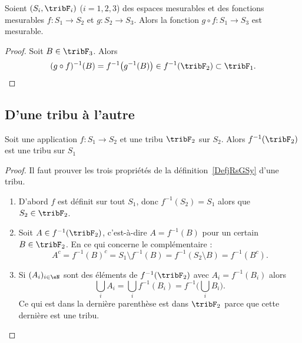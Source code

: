 \begin{proposition}     \label{PROPooEFHKooARJBwW}
    Soient \( (S_i,\tribF_i)\) (\( i=1,2,3\)) des espaces mesurables et des fonctions mesurables \( f\colon S_1\to S_2\) et \( g\colon S_2\to S_3\). Alors la fonction \( g\circ f\colon S_1\to S_3\) est mesurable.
\end{proposition}

\begin{proof}
    Soit \( B\in\tribF_3\). Alors
    \begin{equation}
        (g\circ f)^{-1}(B)=f^{-1}\big( g^{-1}(B) \big)\in f^{-1}(\tribF_2)\subset\tribF_1.
    \end{equation}
\end{proof}

\subsection{D'une tribu à l'autre}

\begin{lemma}       \label{LemooVDXJooZNYelH}
    Soit une application \( f\colon S_1\to S_2\) et une tribu \( \tribF_2\) sur \( S_2\). Alors \( f^{-1}(\tribF_2)\) est une tribu sur \( S_1\)
\end{lemma}

\begin{proof}
    Il faut prouver les trois propriétés de la définition~\ref{DefjRsGSy} d'une tribu.
    \begin{enumerate}
        \item
            D'abord \( f\) est définit sur tout \( S_1\), donc \( f^{-1}(S_2)=S_1\) alors que \( S_2\in \tribF_2\).
        \item
            Soit \( A\in f^{-1}(\tribF_2)\), c'est-à-dire \( A=f^{-1}(B)\) pour un certain \( B\in \tribF_2\). En ce qui concerne le complémentaire :
            \begin{equation}
                A^c=f^{-1}(B)^c=S_1\setminus f^{-1}(B)=f^{-1}(S_2\setminus B)=f^{-1}(B^c).
            \end{equation}
        \item
            Si \( (A_i)_{i\in \eN}\) sont des éléments de \( f^{-1}(\tribF_2)\) avec \( A_i=f^{-1}(B_i)\) alors
            \begin{equation}
                \bigcup_iA_i=\bigcup_if^{-1}(B_i)=f^{-1}\big( \bigcup_iB_i \big).
            \end{equation}
            Ce qui est dans la dernière parenthèse est dans \( \tribF_2\) parce que cette dernière est une tribu.
    \end{enumerate}
\end{proof}

